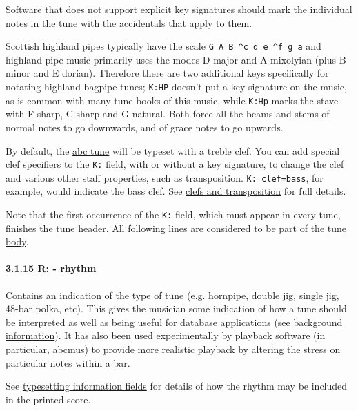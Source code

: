 Software that does not support explicit key signatures should mark the
individual notes in the tune with the accidentals that apply to them.

Scottish highland pipes typically have the scale
\texttt{G\ A\ B\ \^{}c\ d\ e\ \^{}f\ g\ a} and highland pipe music
primarily uses the modes D major and A mixolyian (plus B minor and E
dorian). Therefore there are two additional keys specifically for
notating highland bagpipe tunes; \texttt{K:HP} doesn't put a key
signature on the music, as is common with many tune books of this music,
while \texttt{K:Hp} marks the stave with F sharp, C sharp and G natural.
Both force all the beams and stems of normal notes to go downwards, and
of grace notes to go upwards.

By default, the \protect\hyperlink{abc_tune_definition}{abc tune} will
be typeset with a treble clef. You can add special clef specifiers to
the \texttt{K:} field, with or without a key signature, to change the
clef and various other staff properties, such as transposition.
\texttt{K:\ clef=bass}, for example, would indicate the bass clef. See
\protect\hyperlink{clefs_and_transposition}{clefs and transposition} for
full details.

Note that the first occurrence of the \texttt{K:} field, which must
appear in every tune, finishes the
\protect\hyperlink{tune_header_definition}{tune header}. All following
lines are considered to be part of the
\protect\hyperlink{tune_body_definition}{tune body}.

\hypertarget{rrhythm}{\paragraph{3.1.15 R: - rhythm}\label{rrhythm}}

Contains an indication of the type of tune (e.g. hornpipe, double jig,
single jig, 48-bar polka, etc). This gives the musician some indication
of how a tune should be interpreted as well as being useful for database
applications (see
\protect\hyperlink{bdfsbackground_information}{background information}).
It has also been used experimentally by playback software (in
particular, \href{http://abcnotation.com/software\#abcmus}{abcmus}) to
provide more realistic playback by altering the stress on particular
notes within a bar.

See \protect\hyperlink{typesetting_information_fields}{typesetting
information fields} for details of how the rhythm may be included in the
printed score.

